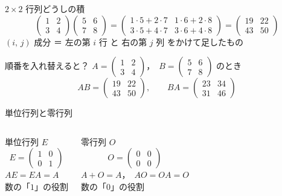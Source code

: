 \documentclass[aspectratio=169]{beamer}
\begin{document}
\begin{frame}{$2 \times 2$ 行列どうしの積}
  \[
    \begin{pmatrix} 1 & 2 \\ 3 & 4 \end{pmatrix}
    \begin{pmatrix} 5 & 6 \\ 7 & 8 \end{pmatrix}
    = \begin{pmatrix}
        1 \cdot 5 + 2 \cdot 7 & 1 \cdot 6 + 2 \cdot 8 \\
        3 \cdot 5 + 4 \cdot 7 & 3 \cdot 6 + 4 \cdot 8
      \end{pmatrix}
    = \begin{pmatrix} 19 & 22 \\ 43 & 50 \end{pmatrix}
  \]
  \medskip
  {\small $(i,\,j)$ 成分 ＝ 左の第 $i$ 行 と 右の第 $j$ 列 をかけて足したもの}
\end{frame}

\begin{frame}{順番を入れ替えると？}
  $A = \begin{pmatrix} 1 & 2 \\ 3 & 4 \end{pmatrix}$，\
  $B = \begin{pmatrix} 5 & 6 \\ 7 & 8 \end{pmatrix}$ のとき
  \[
    AB = \begin{pmatrix} 19 & 22 \\ 43 & 50 \end{pmatrix}, \qquad
    BA = \begin{pmatrix} 23 & 34 \\ 31 & 46 \end{pmatrix}
  \]
\end{frame}

\begin{frame}{単位行列と零行列}
  \begin{columns}[t]
      \begin{block}{単位行列 $E$}
        \[
          E = \begin{pmatrix} 1 & 0 \\ 0 & 1 \end{pmatrix}
        \]
        $AE = EA = A$\\
        {\small 数の「$1$」の役割}
      \end{block}
      \begin{block}{零行列 $O$}
        \[
          O = \begin{pmatrix} 0 & 0 \\ 0 & 0 \end{pmatrix}
        \]
        $A + O = A$，\ $AO = OA = O$\\
        {\small 数の「$0$」の役割}
      \end{block}
  \end{columns}
\end{frame}
\end{document}
